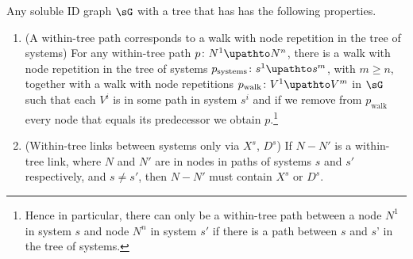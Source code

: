 \newcommand{\atmostonebackdoorsystempernodestatement}{For any node there is at most one backdoor-info system $s$ of which it is one of the nodes in the link $X^s\to D^s$. }
\newcommand{\psys}{p_\mathrm{systems}}
\newcommand{\pwalk}{p_\mathrm{walk}}
\begin{lemma}
\label{le:20Nov24.1-basic-properties-of-trees-with-sufficient-recall-and-unique-systems-and-paths}
Any soluble ID graph $\sG$ with a tree that has \systemsAndPathsUniqueness
has the following properties.
\begin{enumerate}[label=(\alph*)]


    \item (A within-tree path corresponds to a walk with node repetition in the tree of systems) \label{le:20Nov24.1a1-Within-tree-paths-correspond-to-paths-in-the-tree-of-systems}
    For any within-tree path $p\colon  N^1 \upathto N^n$, there is a walk with node repetition in the tree of systems $\psys\colon  s^1 \upathto s^m$, with $m\geq n$, together with a walk with node repetitions $\pwalk\colon V^1 \upathto V^m$ in $\sG$ such that each $V^i$ is in some path in system $s^i$ and if we remove from $\pwalk$ every node that equals its predecessor we obtain $p$.\footnote{Hence in particular, there can only be a within-tree path between a node $N^1$ in system $s$ and node $N^n$ in system $s'$ if there is a path between $s$ and $s’$ in the tree of systems.}

    
    \item (Within-tree links between systems only via $X^s$, $D^s$) \label{le:20Nov24.1a2-Within-tree-links-between-systems-only-via-Xs-Ds}
    If $N - N'$ is a within-tree link, where $N$ and $N'$ are in nodes in paths of systems $s$ and $s'$ respectively, and $s \neq s'$,
    then $N - N'$ must contain $X^s$ or $D^s$.
    
\end{enumerate}
\end{lemma}



